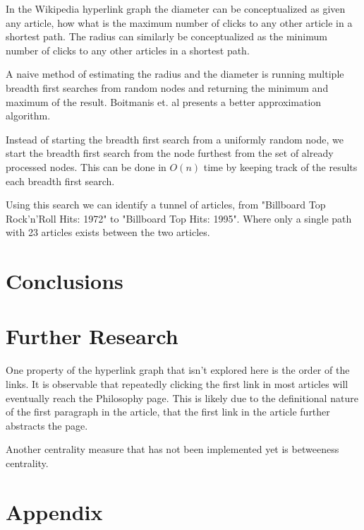 \documentclass{article}
\begin{document}
In the Wikipedia hyperlink graph the diameter can be conceptualized as given any article, how what is the maximum number of clicks to any other article in a shortest path. The radius can similarly be conceptualized as the minimum number of clicks to any other articles in a shortest path.


A naive method of estimating the radius and the diameter is running multiple breadth first searches from random nodes and returning the minimum and maximum of the result. Boitmanis et. al presents a better approximation algorithm.

Instead of starting the breadth first search from a uniformly random node, we start the breadth first search from the node furthest from the set of already processed nodes. This can be done in $O(n)$ time by keeping track of the results each breadth first search.

Using this search we can identify a tunnel of articles, from "Billboard Top Rock'n'Roll Hits: 1972" to "Billboard Top Hits: 1995". Where only a single path with 23 articles exists between the two articles.



\section*{Conclusions}


\section{Further Research}

One property of the hyperlink graph that isn't explored here is the order of the links. It is observable that repeatedly clicking the first link in most articles will eventually reach the Philosophy page. This is likely due to the definitional nature of the first paragraph in the article, that the first link in the article further abstracts the page.


Another centrality measure that has not been implemented yet is betweeness centrality.


\section{Appendix}
\end{document}
